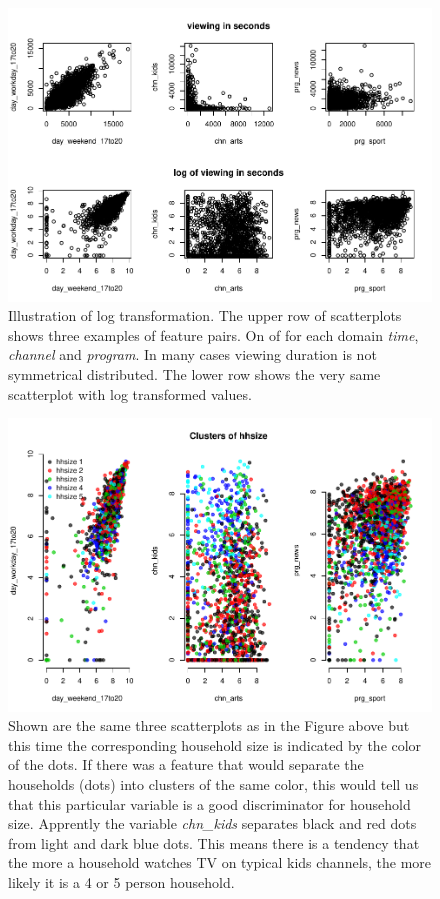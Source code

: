 \documentclass[]{article}
\begin{document}
\pagebreak

\begin{figure}
\centering
\includegraphics{Diploma_files/figure-latex/unnamed-chunk-23-1.pdf}
\caption{\label{fig:fig3} Illustration of log transformation. The upper
row of scatterplots shows three examples of feature pairs. On of for
each domain \emph{time}, \emph{channel} and \emph{program}. In many
cases viewing duration is not symmetrical distributed. The lower row
shows the very same scatterplot with log transformed values.}
\end{figure}

\pagebreak

\begin{figure}
\centering
\includegraphics{Diploma_files/figure-latex/unnamed-chunk-24-1.pdf}
\caption{\label{fig:fig4} Shown are the same three scatterplots as in
the Figure above but this time the corresponding household size is
indicated by the color of the dots. If there was a feature that would
separate the households (dots) into clusters of the same color, this
would tell us that this particular variable is a good discriminator for
household size. Apprently the variable \emph{chn\_kids} separates black
and red dots from light and dark blue dots. This means there is a
tendency that the more a household watches TV on typical kids channels,
the more likely it is a 4 or 5 person household.}
\end{figure}
\end{document}

